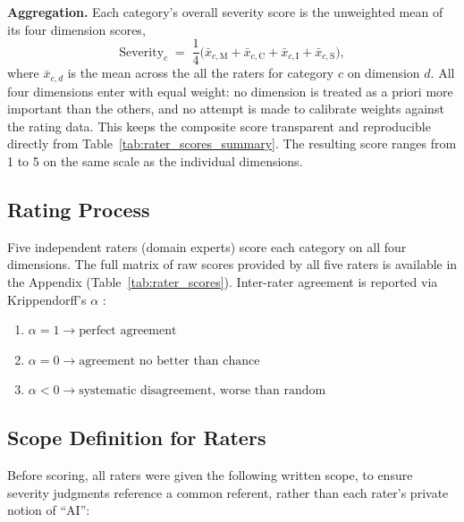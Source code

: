 	

	\textbf{Aggregation.} Each category's overall severity score is the unweighted mean of its four dimension scores,
	\[
	\mathrm{Severity}_c \;=\; \frac{1}{4}\bigl(\bar{x}_{c,\mathrm{M}} + \bar{x}_{c,\mathrm{C}} + \bar{x}_{c,\mathrm{I}} + \bar{x}_{c,\mathrm{S}}\bigr),
	\]
	where $\bar{x}_{c,d}$ is the mean across the all the raters for category $c$ on dimension $d$. All four dimensions enter with equal weight: no dimension is treated as a priori more important than the others, and no attempt is made to calibrate weights against the rating data. This keeps the composite score transparent and reproducible directly from Table~\ref{tab:rater_scores_summary}. The resulting score ranges from 1 to 5 on the same scale as the individual dimensions.

	

	\subsection*{Rating Process}

	Five independent raters (domain experts) score each category on all four dimensions. The full matrix of raw scores provided by all five raters is available in the Appendix (Table~\ref{tab:rater_scores}). Inter-rater agreement is reported via Krippendorff's $\alpha$ \cite{krippendorff2018content, hayes2007answering}:

	\begin{enumerate}
		\item $\alpha = 1 \to \text{perfect agreement}$
		\item $\alpha = 0 \to \text{agreement no better than chance}$
		\item $\alpha < 0 \to \text{systematic disagreement, worse than random}$
	\end{enumerate}

	\subsection*{Scope Definition for Raters}

	Before scoring, all raters were given the following written scope, to ensure severity judgments reference a common referent, rather than each rater's private notion of ``AI'':

